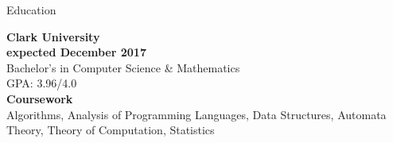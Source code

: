 \documentclass{resume} %
\begin{document}

\begin{rSection}{Education}

\begin{multicols}{2}

{\bf Clark University}\\
{\textcolor{mygray}{\textbf{expected December 2017}}} \\ 
Bachelor's in Computer Science \& Mathematics \\
GPA: 3.96/4.0  \smallskip \\
\vfill
\columnbreak
\textbf{Coursework} \\ Algorithms, Analysis of Programming Languages, Data Structures, Automata Theory, Theory of Computation, Statistics

\end{multicols}

\end{rSection}

\end{document}
